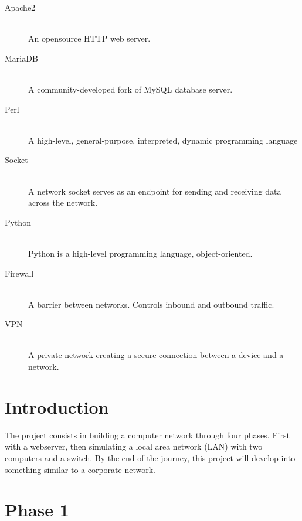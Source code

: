 \documentclass[11pt,a4paper]{report}
\begin{document}
\begin{description}
        \item[Apache2] \hfill \\
            An opensource HTTP web server.
        \item[MariaDB] \hfill \\
            A community-developed fork of MySQL database server.
        \item[Perl] \hfill \\
            A high-level, general-purpose, interpreted, dynamic programming language
        \item[Socket] \hfill \\
            A network socket serves as an endpoint for sending and receiving data across the network.
        \item[Python] \hfill \\
            Python is a high-level programming language, object-oriented.
        \item[Firewall] \hfill \\
            A barrier between networks. Controls inbound and outbound traffic.
        \item[VPN] \hfill \\
            A private network creating a secure connection between a device and a network.
    \end{description}

\chapter{Introduction}
\pagestyle{fancy}
The project consists in building a computer network through four phases. First with a webserver, then simulating a local area network (LAN) with two computers and a switch.
By the end of the journey, this project will develop into something similar to a corporate network.

\setcounter{page}{1}

\chapter{Phase 1}
\end{document}
